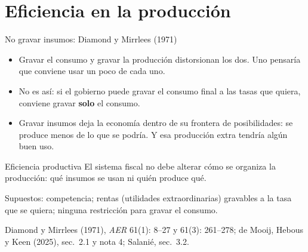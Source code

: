 \documentclass[aspectratio=169,11pt]{beamer}
\newcommand{\fuente}[1]{\par\vfill{\small\color{cGris}#1\par}}
\begin{document}
\section{Eficiencia en la producción}

\begin{frame}{No gravar insumos: Diamond y Mirrlees (1971)}
  \begin{itemize}
    \item Gravar el consumo y gravar la producción distorsionan los dos. Uno pensaría que conviene usar un poco de cada uno.
    \pause
    \item No es así: si el gobierno puede gravar el consumo final a las tasas que quiera, conviene gravar \textbf{solo} el consumo.
    \pause
    \item Gravar insumos deja la economía dentro de su frontera de posibilidades: se produce menos de lo que se podría. Y esa producción extra tendría algún buen uso.
  \end{itemize}
  \pause
  \begin{block}{Eficiencia productiva}
    El sistema fiscal no debe alterar cómo se organiza la producción: qué insumos se usan ni quién produce qué.
  \end{block}
  \pause
  {\small Supuestos: competencia; rentas (utilidades extraordinarias) gravables a la tasa que se quiera; ninguna restricción para gravar el consumo.}
  \fuente{Diamond y Mirrlees (1971), \emph{AER} 61(1): 8--27 y 61(3): 261--278; de Mooij, Hebous y Keen (2025), sec.~2.1 y nota 4; Salanié, sec.~3.2.}
\end{frame}
\end{document}

